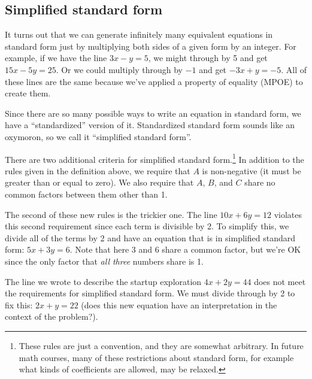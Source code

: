 \subsection{Simplified standard form}

It turns out that we can generate infinitely many equivalent equations in standard form just by multiplying both sides of a given form by an integer. For example, if we have the line $3x-y=5$, we might through by 5 and get $15x-5y=25$. Or we could multiply through by $-1$ and get $-3x+y=-5$. All of these lines are the same because we've applied a property of equality (MPOE) to create them.

Since there are so many possible ways to write an equation in standard form, we have a ``standardized'' version of it. Standardized standard form sounds like an oxymoron, so we call it ``simplified standard form''.

There are two additional criteria for simplified standard form.\footnote{These rules are just a convention, and they are somewhat arbitrary. In future math courses, many of these restrictions about standard form, for example what kinds of coefficients are allowed, may be relaxed.} In addition to the rules given in the definition above, we require that $A$ is non-negative (it must be greater than or equal to zero). We also require that $A$, $B$, and $C$ share no common factors between them other than 1. 

The second of these new rules is the trickier one. The line $10x + 6y = 12$ violates this second requirement since each term is divisible by 2. To simplify this, we divide all of the terms by 2 and have an equation that is in simplified standard form: $5x+3y=6$. Note that here 3 and 6 share a common factor, but we're OK since the only factor that \textit{all three} numbers share is 1.

The line we wrote to describe the startup exploration $4x+2y=44$ does not meet the requirements for simplified standard form. We must divide through by 2 to fix this: $2x+y=22$ (does this new equation have an interpretation in the context of the problem?).

